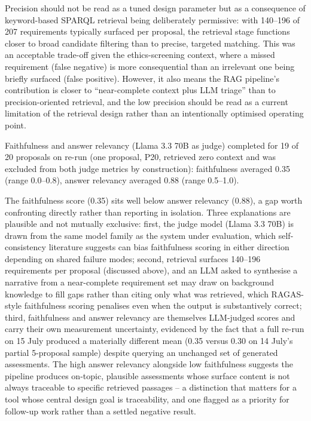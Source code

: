 \documentclass[a4paper,oneside,12pt]{book}
\numberwithin{equation}{chapter}
\begin{document}
Precision should not be read as a tuned design parameter but as a consequence of keyword-based SPARQL retrieval being deliberately permissive: with 140--196 of 207 requirements typically surfaced per proposal, the retrieval stage functions closer to broad candidate filtering than to precise, targeted matching. This was an acceptable trade-off given the ethics-screening context, where a missed requirement (false negative) is more consequential than an irrelevant one being briefly surfaced (false positive). However, it also means the RAG pipeline's contribution is closer to ``near-complete context plus LLM triage'' than to precision-oriented retrieval, and the low precision should be read as a current limitation of the retrieval design rather than an intentionally optimised operating point.

Faithfulness and answer relevancy (Llama 3.3 70B as judge) completed for 19 of 20 proposals on re-run (one proposal, P20, retrieved zero context and was excluded from both judge metrics by construction): faithfulness averaged 0.35 (range 0.0--0.8), answer relevancy averaged 0.88 (range 0.5--1.0).

The faithfulness score (0.35) sits well below answer relevancy (0.88), a gap worth confronting directly rather than reporting in isolation. Three explanations are plausible and not mutually exclusive: first, the judge model (Llama 3.3 70B) is drawn from the same model family as the system under evaluation, which self-consistency literature suggests can bias faithfulness scoring in either direction depending on shared failure modes; second, retrieval surfaces 140--196 requirements per proposal (discussed above), and an LLM asked to synthesise a narrative from a near-complete requirement set may draw on background knowledge to fill gaps rather than citing only what was retrieved, which RAGAS-style faithfulness scoring penalises even when the output is substantively correct; third, faithfulness and answer relevancy are themselves LLM-judged scores and carry their own measurement uncertainty, evidenced by the fact that a full re-run on 15 July produced a materially different mean (0.35 versus 0.30 on 14 July's partial 5-proposal sample) despite querying an unchanged set of generated assessments. The high answer relevancy alongside low faithfulness suggests the pipeline produces on-topic, plausible assessments whose surface content is not always traceable to specific retrieved passages -- a distinction that matters for a tool whose central design goal is traceability, and one flagged as a priority for follow-up work rather than a settled negative result.
\end{document}
